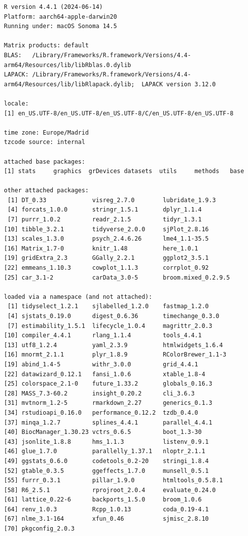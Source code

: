 \documentclass[
  letterpaper,
  DIV=11,
  numbers=noendperiod]{scrreprt}
\begin{document}
\begin{verbatim}
R version 4.4.1 (2024-06-14)
Platform: aarch64-apple-darwin20
Running under: macOS Sonoma 14.5

Matrix products: default
BLAS:   /Library/Frameworks/R.framework/Versions/4.4-arm64/Resources/lib/libRblas.0.dylib 
LAPACK: /Library/Frameworks/R.framework/Versions/4.4-arm64/Resources/lib/libRlapack.dylib;  LAPACK version 3.12.0

locale:
[1] en_US.UTF-8/en_US.UTF-8/en_US.UTF-8/C/en_US.UTF-8/en_US.UTF-8

time zone: Europe/Madrid
tzcode source: internal

attached base packages:
[1] stats     graphics  grDevices datasets  utils     methods   base     

other attached packages:
 [1] DT_0.33             visreg_2.7.0        lubridate_1.9.3    
 [4] forcats_1.0.0       stringr_1.5.1       dplyr_1.1.4        
 [7] purrr_1.0.2         readr_2.1.5         tidyr_1.3.1        
[10] tibble_3.2.1        tidyverse_2.0.0     sjPlot_2.8.16      
[13] scales_1.3.0        psych_2.4.6.26      lme4_1.1-35.5      
[16] Matrix_1.7-0        knitr_1.48          here_1.0.1         
[19] gridExtra_2.3       GGally_2.2.1        ggplot2_3.5.1      
[22] emmeans_1.10.3      cowplot_1.1.3       corrplot_0.92      
[25] car_3.1-2           carData_3.0-5       broom.mixed_0.2.9.5

loaded via a namespace (and not attached):
 [1] tidyselect_1.2.1    sjlabelled_1.2.0    fastmap_1.2.0      
 [4] sjstats_0.19.0      digest_0.6.36       timechange_0.3.0   
 [7] estimability_1.5.1  lifecycle_1.0.4     magrittr_2.0.3     
[10] compiler_4.4.1      rlang_1.1.4         tools_4.4.1        
[13] utf8_1.2.4          yaml_2.3.9          htmlwidgets_1.6.4  
[16] mnormt_2.1.1        plyr_1.8.9          RColorBrewer_1.1-3 
[19] abind_1.4-5         withr_3.0.0         grid_4.4.1         
[22] datawizard_0.12.1   fansi_1.0.6         xtable_1.8-4       
[25] colorspace_2.1-0    future_1.33.2       globals_0.16.3     
[28] MASS_7.3-60.2       insight_0.20.2      cli_3.6.3          
[31] mvtnorm_1.2-5       rmarkdown_2.27      generics_0.1.3     
[34] rstudioapi_0.16.0   performance_0.12.2  tzdb_0.4.0         
[37] minqa_1.2.7         splines_4.4.1       parallel_4.4.1     
[40] BiocManager_1.30.23 vctrs_0.6.5         boot_1.3-30        
[43] jsonlite_1.8.8      hms_1.1.3           listenv_0.9.1      
[46] glue_1.7.0          parallelly_1.37.1   nloptr_2.1.1       
[49] ggstats_0.6.0       codetools_0.2-20    stringi_1.8.4      
[52] gtable_0.3.5        ggeffects_1.7.0     munsell_0.5.1      
[55] furrr_0.3.1         pillar_1.9.0        htmltools_0.5.8.1  
[58] R6_2.5.1            rprojroot_2.0.4     evaluate_0.24.0    
[61] lattice_0.22-6      backports_1.5.0     broom_1.0.6        
[64] renv_1.0.3          Rcpp_1.0.13         coda_0.19-4.1      
[67] nlme_3.1-164        xfun_0.46           sjmisc_2.8.10      
[70] pkgconfig_2.0.3    
\end{verbatim}
\end{document}
